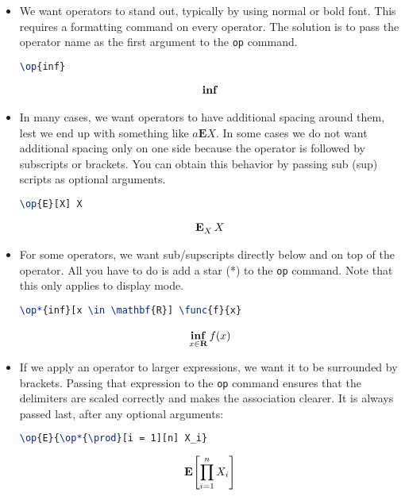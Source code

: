 \documentclass[a4paper,10pt]{scrartcl}
\begin{document}
\begin{itemize}
\item 
We want operators to stand out, typically by using normal or bold font. This requires a formatting command on every operator. The solution is to pass the operator name as the first argument to the \texttt{op} command. 
\begin{lstlisting}[caption=Names, language=TeX]
\op{inf}
\end{lstlisting}
\begin{align} 
  \op{inf} 
\end{align} 
\item 
In many cases, we want operators to have additional spacing around them, lest we end up with something like $a \mathbf{E} X$. In some cases we do not want additional spacing only on one side because the operator is followed by subscripts or brackets. You can obtain this behavior by passing sub (sup) scripts as optional arguments.
\begin{lstlisting}[caption=Spacing, language=TeX]
\op{E}[X] X
\end{lstlisting}
\begin{align} 
  \op{E}[X] X
\end{align} 
\item 
For some operators, we want sub/supscripts directly below and on top of the operator. All you have to do is add a star (*) to the \texttt{op} command. Note that this only applies to display mode.
\begin{lstlisting}[caption=Limits, language=TeX]
\op*{inf}[x \in \mathbf{R}] \func{f}{x}
\end{lstlisting}
\begin{align} 
  \op*{inf}[x \in \mathbf{R}] \func{f}{x}
\end{align}
\item
If we apply an operator to larger expressions, we want it to be surrounded by brackets. Passing that expression to the \texttt{op} command ensures that the delimiters are scaled correctly and makes the association clearer. It is always passed last, after any optional arguments:
\begin{lstlisting}[caption=Brackets, language=TeX]
\op{E}{\op*{\prod}[i = 1][n] X_i}
\end{lstlisting}
\begin{align} 
\op{E}{\op*{\prod}[i = 1][n] X_i}
\end{align}
\end{itemize}
\end{document}
